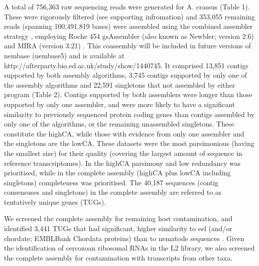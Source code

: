 \documentclass[10pt]{bmc_article}
\newenvironment{bmcformat}{\begin{raggedright}\baselineskip20pt\sloppy\setboolean{publ}{false}}{\end{raggedright}\baselineskip20pt\sloppy}
\begin{document}
\begin{bmcformat}
A total of 756,363 raw sequencing reads were generated for A. crassus
(Table 1). These were rigorously filtered (see supporting infromation)
and 353,055 remaining reads (spanning 100,491,819 bases) were
assembled using the combined assembler strategy \cite{pmid20950480},
employing Roche 454 gsAssembler (also known as Newbler; version 2.6)
and MIRA (version 3.21) \cite{miraEST}. This coassembly will be
included in future versions of nembase (nembase5) and is available at
http://afterparty.bio.ed.ac.uk/study/show/1440745. It comprised
13,851 contigs supported by both assembly algorithms,
3,745 contigs supported by only one of the assembly
algorithms and 22,591 singletons that not assembled by
either program (Table 2). Contigs supported by both assemblers were
longer than those supported by only one assembler, and were more
likely to have a significant similarity to previously sequenced
protein coding genes than contigs assembled by only one of the
algorithms, or the remaining unassembled singletons. These constitute
the highCA, while those with evidence from only one assembler and the
singletons are the lowCA. These datasets were the most parsimonious
(having the smallest size) for their quality (covering the largest
amount of sequence in reference transcriptomes). In the highCA
parsimony and low redundancy was prioritised, while in the complete
assembly (highCA plus lowCA including singletons) completeness was
prioritised. The 40,187 sequences (contig consensuses and singletons)
in the complete assembly are referred to as tentatively unique genes
(TUGs).




We screened the complete assembly for remaining host contamination,
and identified 3,441 TUGs that had significant, higher
similarity to eel (and/or chordate; EMBLBank Chordata proteins) than
to nematode sequences \cite{pmid21550347}. Given the identification of
cercozoan ribosomal RNAs in the L2 library, we also screened the
complete assembly for contamination with transcripts from other taxa.


\end{bmcformat}
\end{document}
